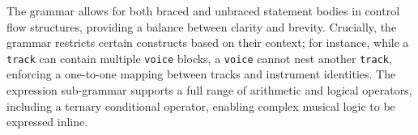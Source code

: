 The grammar allows for both braced and unbraced statement bodies in control flow structures, providing a balance between
clarity and brevity.
Crucially, the grammar restricts certain constructs based on their context; for instance, while a \texttt{track} can
contain multiple \texttt{voice} blocks, a \texttt{voice} cannot nest another \texttt{track}, enforcing a one-to-one
mapping between tracks and instrument identities.
The expression sub-grammar supports a full range of arithmetic and logical operators, including a ternary conditional
operator, enabling complex musical logic to be expressed inline.
